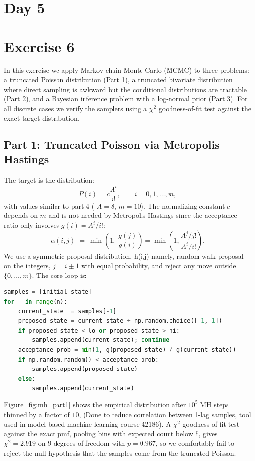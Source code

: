 \section*{Day 5}
\section*{Exercise 6}

In this exercise we apply Markov chain Monte Carlo (MCMC) to three problems:
a truncated Poisson distribution (Part 1), a truncated bivariate distribution
where direct sampling is awkward but the conditional distributions are
tractable (Part 2), and a Bayesian inference problem with a log-normal prior
(Part 3). For all discrete cases we verify the samplers using a $\chi^2$
goodness-of-fit test against the exact target distribution.

\subsection{Part 1: Truncated Poisson via Metropolis Hastings}

The target is the distribution:
\begin{equation}
    P(i) = c\frac{A^{i}}{i!}, \qquad i=0,1,\dots,m,
\end{equation}
with values similar to part 4 ( $A=8$, $m=10$). The normalizing constant $c$ depends on $m$ and is not
needed by Metropolis Hastings since the acceptance ratio only involves
$g(i)=A^{i}/i!$:
\begin{equation}
    \alpha(i,j) \;=\; \min\!\left(1,\;\frac{g(j)}{g(i)}\right)
                = \min \left(1, \frac{A^j/j!}{A^i/i!}\right).
\end{equation}
We use a symmetric proposal distribution, h(i,j) namely, random-walk proposal on the integers, $j = i \pm 1$ with
equal probability, and reject any move outside $\{0,\dots,m\}$. The core loop
is:
\begin{lstlisting}[language=Python]
samples = [initial_state]
for _ in range(n):
    current_state  = samples[-1]
    proposed_state = current_state + np.random.choice([-1, 1])
    if proposed_state < lo or proposed_state > hi:
        samples.append(current_state); continue
    acceptance_prob = min(1, g(proposed_state) / g(current_state))
    if np.random.random() < acceptance_prob:
        samples.append(proposed_state)
    else:
        samples.append(current_state)
\end{lstlisting}
Figure~\ref{fig:mh_part1} shows the empirical distribution after $10^{5}$ MH
steps thinned by a factor of $10$, (Done to reduce correlation between 1-lag samples, tool used in model-based machine learning course 42186). A $\chi^2$ goodness-of-fit test against the
exact pmf, pooling bins with expected count below $5$, gives
$\chi^2 = 2.919$ on $9$ degrees of freedom with $p = 0.967$, so we
comfortably fail to reject the null hypothesis that the samples come from
the truncated Poisson.


